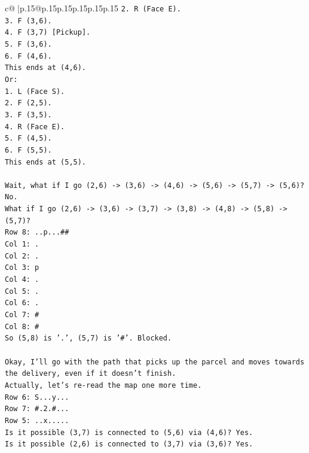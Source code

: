 \documentclass{article}
\begin{document}
{\begin{supertabular}{c@{$\;$}|p{.15\linewidth}@{}p{.15\linewidth}p{.15\linewidth}p{.15\linewidth}p{.15\linewidth}p{.15\linewidth}}
{{{\texttt{2. R (Face E).} \\
\texttt{3. F (3,6).} \\
\texttt{4. F (3,7) {[}Pickup{]}.} \\
\texttt{5. F (3,6).} \\
\texttt{6. F (4,6).} \\
\texttt{This ends at (4,6).} \\
\texttt{Or:} \\
\texttt{1. L (Face S).} \\
\texttt{2. F (2,5).} \\
\texttt{3. F (3,5).} \\
\texttt{4. R (Face E).} \\
\texttt{5. F (4,5).} \\
\texttt{6. F (5,5).} \\
\texttt{This ends at (5,5).} \\
\\ 
\texttt{Wait, what if I go (2,6) {-}> (3,6) {-}> (4,6) {-}> (5,6) {-}> (5,7) {-}> (5,6)? No.} \\
\texttt{What if I go (2,6) {-}> (3,6) {-}> (3,7) {-}> (3,8) {-}> (4,8) {-}> (5,8) {-}> (5,7)?} \\
\texttt{Row 8: ..p...\#\#} \\
\texttt{Col 1: .} \\
\texttt{Col 2: .} \\
\texttt{Col 3: p} \\
\texttt{Col 4: .} \\
\texttt{Col 5: .} \\
\texttt{Col 6: .} \\
\texttt{Col 7: \#} \\
\texttt{Col 8: \#} \\
\texttt{So (5,8) is '.', (5,7) is '\#'. Blocked.} \\
\\ 
\texttt{Okay, I'll go with the path that picks up the parcel and moves towards the delivery, even if it doesn't finish.} \\
\texttt{Actually, let's re{-}read the map one more time.} \\
\texttt{Row 6: S...y...} \\
\texttt{Row 7: \#.2.\#...} \\
\texttt{Row 5: ..x.....} \\
\texttt{Is it possible (3,7) is connected to (5,6) via (4,6)? Yes.} \\
\texttt{Is it possible (2,6) is connected to (3,7) via (3,6)? Yes.} \\
}}}
\end{supertabular}}
\end{document}
